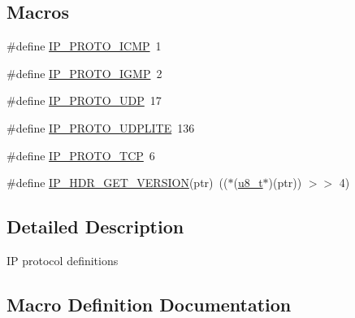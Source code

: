 \subsection*{Macros}
\begin{DoxyCompactItemize}
\item 
\#define \hyperlink{openmote-cc2538_2lwip_2src_2include_2lwip_2prot_2ip_8h_aacaea7b8c4c8a5229c02b653766b4793}{I\+P\+\_\+\+P\+R\+O\+T\+O\+\_\+\+I\+C\+MP}~1
\item 
\#define \hyperlink{openmote-cc2538_2lwip_2src_2include_2lwip_2prot_2ip_8h_a4f8609139fce15ace0c6d117021e29a4}{I\+P\+\_\+\+P\+R\+O\+T\+O\+\_\+\+I\+G\+MP}~2
\item 
\#define \hyperlink{openmote-cc2538_2lwip_2src_2include_2lwip_2prot_2ip_8h_a76212e7ef71a99646040d2e454388bed}{I\+P\+\_\+\+P\+R\+O\+T\+O\+\_\+\+U\+DP}~17
\item 
\#define \hyperlink{openmote-cc2538_2lwip_2src_2include_2lwip_2prot_2ip_8h_a3ef2b8a1cb4f7acee3142337438dfd0d}{I\+P\+\_\+\+P\+R\+O\+T\+O\+\_\+\+U\+D\+P\+L\+I\+TE}~136
\item 
\#define \hyperlink{openmote-cc2538_2lwip_2src_2include_2lwip_2prot_2ip_8h_a634284ee3a136d6ad61bc5d917ebb82f}{I\+P\+\_\+\+P\+R\+O\+T\+O\+\_\+\+T\+CP}~6
\item 
\#define \hyperlink{openmote-cc2538_2lwip_2src_2include_2lwip_2prot_2ip_8h_afc29766fb0707c63b64568c5fa44a374}{I\+P\+\_\+\+H\+D\+R\+\_\+\+G\+E\+T\+\_\+\+V\+E\+R\+S\+I\+ON}(ptr)~(($\ast$(\hyperlink{group__compiler__abstraction_ga4caecabca98b43919dd11be1c0d4cd8e}{u8\+\_\+t}$\ast$)(ptr)) $>$$>$ 4)
\end{DoxyCompactItemize}


\subsection{Detailed Description}
IP protocol definitions 

\subsection{Macro Definition Documentation}
\mbox{\label{openmote-cc2538_2lwip_2src_2include_2lwip_2prot_2ip_8h_afc29766fb0707c63b64568c5fa44a374}} 
